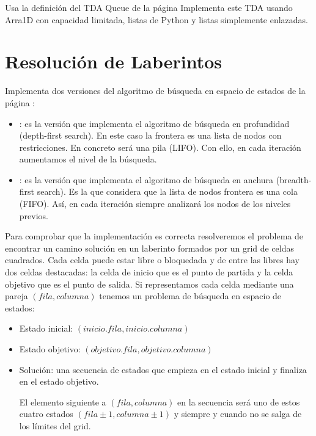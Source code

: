 Usa la definición del TDA Queue de la página \pageref{sec:Cola}
Implementa este TDA usando Arra1D con capacidad limitada, listas de Python y listas simplemente enlazadas.





\separacion
\section{Resolución de Laberintos} \label{ejerc:laberintos}

Implementa dos versiones del algoritmo de búsqueda en espacio de estados de la página \pageref{algorithm:search}:
\begin{itemize}
\item {}: es la versión que implementa el algoritmo de búsqueda en profundidad (depth-first search). En este caso la frontera es una lista de nodos con restricciones. En concreto será una pila (LIFO). Con ello, en cada iteración aumentamos el nivel de la búsqueda. 
\item {}: es la versión que implementa el algoritmo de búsqueda en anchura (breadth-first search). Es la que considera que la lista de nodos frontera es una cola (FIFO).
Así, en cada iteración siempre analizará los nodos de los niveles previos.
\end{itemize}


Para comprobar que la implementación es correcta resolveremos el problema de encontrar un camino solución en un laberinto formados por un grid de celdas cuadrados. Cada celda puede estar libre o bloquedada y de entre las libres hay dos celdas destacadas: la celda de inicio que es el punto de partida y la celda objetivo que es el punto de salida. Si representamos cada celda mediante una pareja $(fila, columna)$ tenemos un problema de búsqueda en espacio de estados:
\begin{itemize}
\item Estado inicial: $(inicio.fila, inicio.columna)$
\item Estado objetivo: $(objetivo.fila, objetivo.columna)$
\item Solución: una secuencia de estados que empieza en el estado inicial y finaliza en el estado objetivo.

El elemento siguiente a $(fila, columna)$ en la secuencia será uno de estos cuatro estados
$(fila\pm 1, columna\pm 1)$ y siempre y cuando no se salga de los límites del grid.
\end{itemize}


